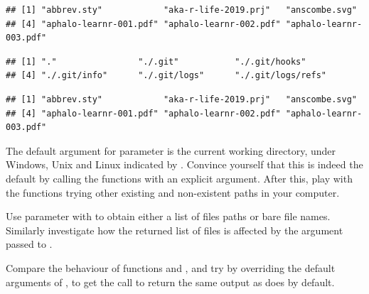 \documentclass[krantz2]{krantz}\usepackage{knitr}%
\begin{document}
\begin{knitrout}\footnotesize
{}\color{fgcolor}\begin{kframe}
\begin{alltt}
\hlstd{(}\hlstd{())}
\end{alltt}
\begin{verbatim}
## [1] "abbrev.sty"            "aka-r-life-2019.prj"   "anscombe.svg"         
## [4] "aphalo-learnr-001.pdf" "aphalo-learnr-002.pdf" "aphalo-learnr-003.pdf"
\end{verbatim}
\begin{alltt}
\hlstd{(}\hlstd{())}
\end{alltt}
\begin{verbatim}
## [1] "."                "./.git"           "./.git/hooks"    
## [4] "./.git/info"      "./.git/logs"      "./.git/logs/refs"
\end{verbatim}
\begin{alltt}
\hlstd{(}\hlstd{())}
\end{alltt}
\begin{verbatim}
## [1] "abbrev.sty"            "aka-r-life-2019.prj"   "anscombe.svg"         
## [4] "aphalo-learnr-001.pdf" "aphalo-learnr-002.pdf" "aphalo-learnr-003.pdf"
\end{verbatim}
\end{kframe}
\end{knitrout}

\begin{playground}
The default argument for parameter  is the current working directory, under Windows, Unix and Linux indicated by . Convince yourself that this is indeed the default by calling the functions with an explicit argument. After this, play with the functions trying other existing and non-existent paths in your computer.
\end{playground}

\begin{playground}
Use parameter  with  to obtain either a list of files paths or bare file names. Similarly investigate how the returned list of files is affected by the argument passed to .
\end{playground}

\begin{playground}
Compare the behaviour of functions  and , and try by overriding the default arguments of , to get the call to return the same output as  does by default.
\end{playground}
\end{document}
